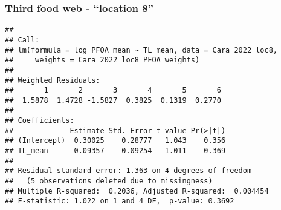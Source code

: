 \documentclass[
]{article}
\newenvironment{Shaded}{\begin{snugshade}}{\end{snugshade}}
\newcommand{\AttributeTok}[1]{\textcolor[rgb]{0.13,0.29,0.53}{#1}}
\newcommand{\DecValTok}[1]{\textcolor[rgb]{0.00,0.00,0.81}{#1}}
\newcommand{\FunctionTok}[1]{\textcolor[rgb]{0.13,0.29,0.53}{\textbf{#1}}}
\newcommand{\NormalTok}[1]{#1}
\newcommand{\OtherTok}[1]{\textcolor[rgb]{0.56,0.35,0.01}{#1}}
\newcommand{\SpecialCharTok}[1]{\textcolor[rgb]{0.81,0.36,0.00}{\textbf{#1}}}
\newcommand{\StringTok}[1]{\textcolor[rgb]{0.31,0.60,0.02}{#1}}
\begin{document}
\subsubsection{Third food web - ``location
8''}\label{third-food-web---location-8}

\begin{Shaded}
\end{Shaded}

\begin{verbatim}
## 
## Call:
## lm(formula = log_PFOA_mean ~ TL_mean, data = Cara_2022_loc8, 
##     weights = Cara_2022_loc8_PFOA_weights)
## 
## Weighted Residuals:
##       1       2       3       4       5       6 
##  1.5878  1.4728 -1.5827  0.3825  0.1319  0.2770 
## 
## Coefficients:
##             Estimate Std. Error t value Pr(>|t|)
## (Intercept)  0.30025    0.28777   1.043    0.356
## TL_mean     -0.09357    0.09254  -1.011    0.369
## 
## Residual standard error: 1.363 on 4 degrees of freedom
##   (5 observations deleted due to missingness)
## Multiple R-squared:  0.2036, Adjusted R-squared:  0.004454 
## F-statistic: 1.022 on 1 and 4 DF,  p-value: 0.3692
\end{verbatim}
\end{document}

